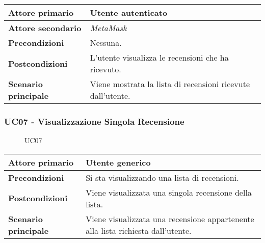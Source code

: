             \begin{center}
                \renewcommand{\arraystretch}{1.5}
                \begin{tabular}{m{10em} m{20em}}
                    \hline
                    \textbf{Attore primario} & Utente autenticato \\
                    \hline
                    \textbf{Attore secondario} & \textit{MetaMask} \\
                    \hline
                    \textbf{Precondizioni} & Nessuna. \\
                    \hline
                    \textbf{Postcondizioni} & L'utente visualizza le recensioni che ha ricevuto. \\
                    \hline
                    \textbf{Scenario principale} & Viene mostrata la lista di recensioni ricevute dall'utente. \\
                    \hline
                \end{tabular}
            \end{center}

        \subsubsection{UC07 - Visualizzazione Singola Recensione}
        \label{UC07}

            \begin{figure}[H]
                \centering
                
                \caption{UC07}
            \end{figure}

            \begin{center}
                \renewcommand{\arraystretch}{1.5}
                \begin{tabular}{m{10em} m{20em}}
                    \hline
                    \textbf{Attore primario} & Utente generico \\
                    \hline
                    \textbf{Precondizioni} & Si sta visualizzando una lista di recensioni. \\
                    \hline
                    \textbf{Postcondizioni} & Viene visualizzata una singola recensione della lista. \\
                    \hline
                    \textbf{Scenario principale} & Viene visualizzata una recensione appartenente alla lista richiesta dall'utente. \\
                    \hline
                \end{tabular}
            \end{center}

